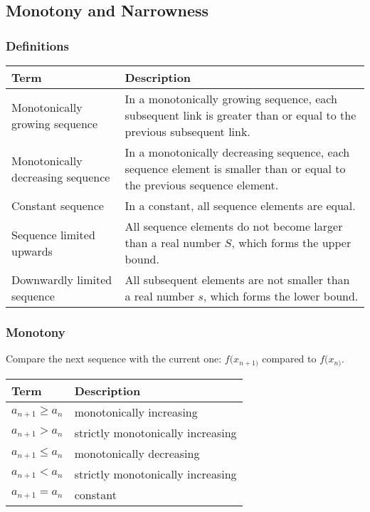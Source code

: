 \documentclass{book}
\begin{document}
\subsection{Monotony and Narrowness}
\subsubsection{Definitions}
\begin{tabular}{p{3cm}p{10.5cm}}
  \toprule
  \textbf{Term} & \textbf{Description} \\
  \midrule
  Monotonically growing sequence & In a monotonically growing sequence, each subsequent link is greater than or equal to the previous subsequent link.\\
  \midrule
  Monotonically decreasing sequence & In a monotonically decreasing sequence, each sequence element is smaller than or equal to the previous sequence element.\\
  \midrule
  Constant sequence & In a constant, all sequence elements are equal.\\
  \midrule
  Sequence limited upwards & All sequence elements do not become larger than a real number $S$, which forms the upper bound.\\
  \midrule
  Downwardly limited sequence & All subsequent elements are not smaller than a real number $s$, which forms the lower bound.\\
  \bottomrule
\end{tabular}
\subsubsection{Monotony}
Compare the next sequence with the current one: $f(x_{n+1)}$ compared to $f(x_{n)}$.

\begin{tabular}{lp{10.5cm}}
  \toprule
  \textbf{Term} & \textbf{Description} \\
  \midrule
  $a_{n+1} \geq a_{n}$    & monotonically increasing\\
  \midrule
  $a_{n+1} > a_{n}$    & strictly monotonically increasing\\
  \midrule
  $a_{n+1} \leq a_{n}$    & monotonically decreasing\\
  \midrule
  $a_{n+1} < a_{n}$    & strictly monotonically increasing\\
  \midrule
  $a_{n+1} = a_{n}$    & constant\\
  \bottomrule
\end{tabular}
\end{document}
